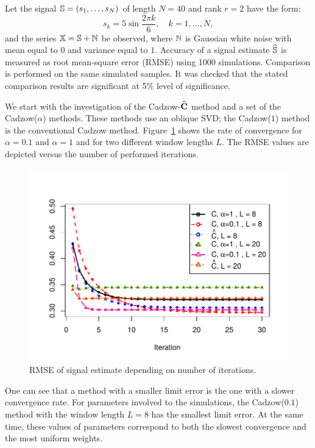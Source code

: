 \documentclass[sii]{ipart}
\begin{document}
Let the signal $\mathbb{S} = (s_{1}, \ldots, s_N)$ of length $N = 40$ and rank $r=2$ have the form:
\begin{equation*}
s_{k} = 5\sin{\frac{2 \pi k}{6}}, \quad k = 1, \ldots, N,
\end{equation*}
and the series $\mathbb{X} = \mathbb{S} + \mathbb{N}$ be observed, where  $\mathbb{N}$ is Gaussian white noise with mean equal to $0$ and variance equal to $1$. Accuracy of a signal estimate $\widehat{\mathbb{S}}$ is measured as root mean-square error (RMSE) using 1000 simulations. Comparison is performed on the same simulated samples. It was checked that the stated comparison results are significant at 5\% level of significance.

We start with the investigation of the Cadzow-$\widehat{\mathbf{C}}$ method and a set of the Cadzow($\alpha$) methods. These methods use an oblique SVD; the Cadzow($1$) method is the conventional Cadzow method. Figure~\ref{img_cadzowspeed2} shows the rate of convergence for $\alpha = 0.1$ and $\alpha = 1$ and for two different window lengths $L$. The RMSE values are depicted versus the number of performed iterations.

\begin{figure}[!hhh]
		\includegraphics[width = \columnwidth]{cadzowspeed_2.pdf}
		\caption{RMSE of signal estimate depending on number of iterations.}
		\label{img_cadzowspeed2}
\end{figure}

One can see that a method with a smaller limit error is the one with a slower convergence rate. For parameters involved to the simulations, the Cadzow($0.1$) method with the window length $L=8$ has the smallest limit error. At the same time, these values of parameters correspond to both the slowest convergence and the most uniform weights.
\end{document}
